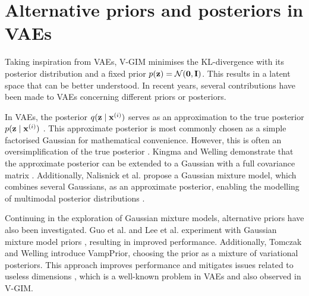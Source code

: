 \section{Alternative priors and posteriors in VAEs}
	Taking inspiration from VAEs, V-GIM minimises the KL-divergence with its posterior distribution and a fixed prior $p(\mathbf{z})=\mathcal{N}(\bm{\mathbf{0}}, \mathbf{I})$. This results in a latent space that can be better understood. In recent years, several contributions have been made to VAEs concerning different priors or posteriors.
	
	In VAEs, the posterior $q (\mathbf{z} \mid \mathbf{x}^{(i)})$ serves as an approximation to the true posterior $p (\mathbf{z} \mid \mathbf{x}^{(i)})$ \cite{odaiboTutorialDerivingStandard2019}. This approximate posterior is most commonly chosen as a simple factorised Gaussian for mathematical convenience. However, this is often an oversimplification of the true posterior \cite{nalisnickApproximateInferenceDeep2016a}. Kingma and Welling demonstrate that the approximate posterior can be extended to a Gaussian with a full covariance matrix \cite{kingmaIntroductionVariationalAutoencoders2019}. Additionally, Nalisnick et al. propose a Gaussian mixture model, which combines several Gaussians, as an approximate posterior, enabling the modelling of multimodal posterior distributions \cite{nalisnickApproximateInferenceDeep2016a}.
	
	Continuing in the exploration of Gaussian mixture models, alternative priors have also been investigated. Guo et al. and Lee et al. experiment with Gaussian mixture model priors \cite{guoVariationalAutoencoderOptimizing2020, leeMetaGMVAEMixtureGaussian2021}, resulting in improved performance. Additionally, Tomczak and Welling introduce VampPrior, choosing the prior as a mixture of variational posteriors. This approach improves performance and mitigates issues related to useless dimensions \cite{tomczakVAEVampPrior2018}, which is a well-known problem in VAEs and also observed in V-GIM.
	












